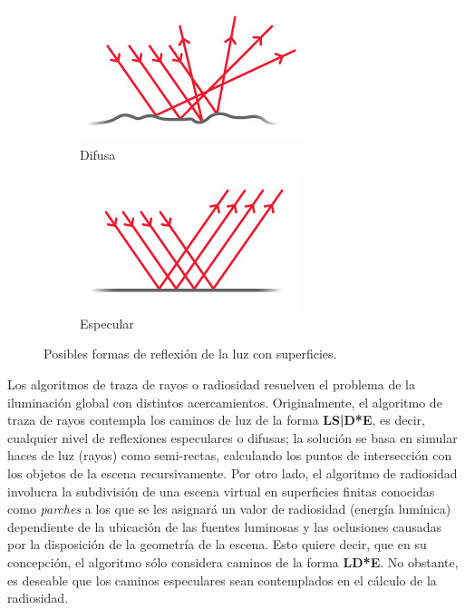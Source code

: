 \vspace{5mm}
\begin{figure}[htbp]
	\begin{subfigure}{0.5\textwidth}
		\centering
		\includegraphics[width=1\linewidth]{assets/difusa1}
		\caption{Difusa}
	\end{subfigure}
	\begin{subfigure}{0.5\textwidth}
		\centering
		\includegraphics[width=1\linewidth]{assets/especular1}
		\caption{Especular}
	\end{subfigure}
	\caption{Posibles formas de reflexión de la luz con superficies.}
	\label{img:difspecularr}
\end{figure}

Los algoritmos de traza de rayos o radiosidad resuelven el problema de la iluminación global con distintos acercamientos. Originalmente, el algoritmo de traza de rayos contempla los caminos de luz de la forma \textbf{L{S|D}*E}, es decir, cualquier nivel de reflexiones especulares o difusas; la solución se basa en simular haces de luz (rayos) como semi-rectas, calculando los puntos de intersección con los objetos de la escena recursivamente. Por otro lado, el algoritmo de radiosidad involucra la subdivisión de una escena virtual en superficies finitas conocidas como \textit{parches} a los que se les asignará un valor de radiosidad (energía lumínica) dependiente de la ubicación de las fuentes luminosas y las oclusiones causadas por la disposición de la geometría de la escena. Esto quiere decir, que en su concepción, el algoritmo sólo considera caminos de la forma \textbf{L{D}*E}. No obstante, es deseable que los caminos especulares sean contemplados en el cálculo de la radiosidad.


